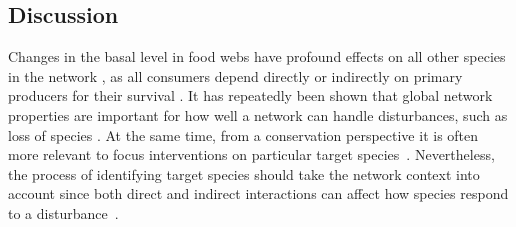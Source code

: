 \documentclass[12pt]{article}
\begin{document}
\begin{spacing}{2.0}


        


\clearpage



\section*{Discussion}




Changes in the basal level in food webs have profound effects on all other species in the network \citep{}, as all consumers depend directly or indirectly on primary producers for their survival \citep{}. It has repeatedly been shown that global network properties are important for how well a network can handle disturbances, such as loss of species \citep{Eklof2006, Dunne2002}. At the same time, from a conservation perspective it is often more relevant to focus interventions on particular target species~\citep{}. Nevertheless, the process of identifying target species should take the network context into account since both direct and indirect interactions can affect how species respond to a disturbance~\citep{}. 


\end{spacing}
\end{document}
